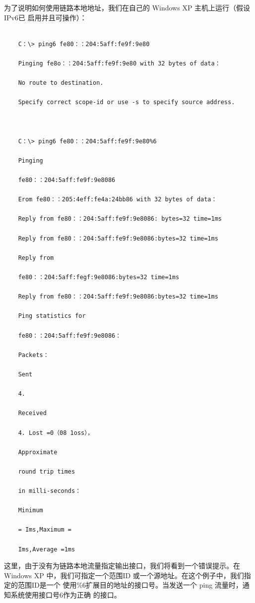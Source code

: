 为了说明如何使用链路本地地址，我们在自己的 Windows XP 主机上运行（假设IPv6已
启用并且可操作）：
\begin{verbatim}
    
    C：\> ping6 fe80：：204:5aff:fe9f:9e80
    
    Pinging fe8o：：204:5aff:fe9f:9e80 with 32 bytes of data：
    
    No route to destination.
    
    Specify correct scope-id or use -s to specify source address.
    
    
    
    C：\> ping6 fe80：：204:5aff:fe9f:9e80%6
    
    Pinging
    
    fe80：：204:5aff:fe9f:9e8086
    
    Erom fe80：：205:4eff:fe4a:24bb86 with 32 bytes of data：
    
    Reply from fe80：：204:5aff:fe9f:9e8086: bytes=32 time=1ms
    
    Reply from fe80：：204:5aff:fe9f:9e8086:bytes=32 time=1ms
    
    Reply from
    
    fe80：：204:5aff:fegf:9e8086:bytes=32 time=1ms
    
    Reply from fe80：：204:5aff:fe9f:9e8086:bytes=32 time=1ms
    
    Ping statistics for
    
    fe80：：204:5aff:fe9f:9e8086：
    
    Packets：
    
    Sent
    
    4.
    
    Received
    
    4. Lost =0（08 1oss），
    
    Approximate
    
    round trip times
    
    in milli-seconds：
    
    Minimum
    
    = Ims,Maximum =
    
    Ims,Average =1ms
\end{verbatim}

这里，由于没有为链路本地流量指定输出接口，我们将看到一个错误提示。在 Windows
XP 中，我们可指定一个范围ID 或一个源地址。在这个例子中，我们指定的范围ID是一个
使用\%6扩展目的地址的接口号。当发送一个 ping 流量时，通知系统使用接口号6作为正确
的接口。

